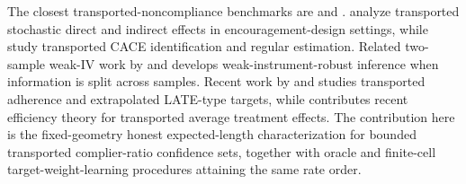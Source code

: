 The closest transported-noncompliance benchmarks are \citet{RudolphVanderLaan2017} and \citet{ChenHuang2025}. \citet{RudolphVanderLaan2017} analyze transported stochastic direct and indirect effects in encouragement-design settings, while \citet{ChenHuang2025} study transported CACE identification and regular estimation. Related two-sample weak-IV work by \citet{ChoiGuShen2018} and \citet{ChoiShen2019} develops weak-instrument-robust inference when information is split across samples. Recent work by \citet{Ross2026} and \citet{Ren2025} studies transported adherence and extrapolated LATE-type targets, while \citet{Rudolph2025} contributes recent efficiency theory for transported average treatment effects. The contribution here is the fixed-geometry honest expected-length characterization for bounded transported complier-ratio confidence sets, together with oracle and finite-cell target-weight-learning procedures attaining the same rate order.
